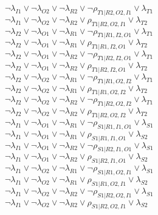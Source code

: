$\neg\lambda_{I1} \vee \neg\lambda_{O2} \vee \neg\lambda_{R2} \vee \neg\rho_{T1|R2,O2,I1} \vee \lambda_{T1}$\\
$\neg\lambda_{I1} \vee \neg\lambda_{O2} \vee \neg\lambda_{R2} \vee \rho_{T1|R2,O2,I1} \vee \lambda_{T2}$\\
$\neg\lambda_{I2} \vee \neg\lambda_{O1} \vee \neg\lambda_{R1} \vee \neg\rho_{T1|R1,I2,O1} \vee \lambda_{T1}$\\
$\neg\lambda_{I2} \vee \neg\lambda_{O1} \vee \neg\lambda_{R1} \vee \rho_{T1|R1,I2,O1} \vee \lambda_{T2}$\\
$\neg\lambda_{I2} \vee \neg\lambda_{O1} \vee \neg\lambda_{R2} \vee \neg\rho_{T1|R2,I2,O1} \vee \lambda_{T1}$\\
$\neg\lambda_{I2} \vee \neg\lambda_{O1} \vee \neg\lambda_{R2} \vee \rho_{T1|R2,I2,O1} \vee \lambda_{T2}$\\
$\neg\lambda_{I2} \vee \neg\lambda_{O2} \vee \neg\lambda_{R1} \vee \neg\rho_{T1|R1,O2,I2} \vee \lambda_{T1}$\\
$\neg\lambda_{I2} \vee \neg\lambda_{O2} \vee \neg\lambda_{R1} \vee \rho_{T1|R1,O2,I2} \vee \lambda_{T2}$\\
$\neg\lambda_{I2} \vee \neg\lambda_{O2} \vee \neg\lambda_{R2} \vee \neg\rho_{T1|R2,O2,I2} \vee \lambda_{T1}$\\
$\neg\lambda_{I2} \vee \neg\lambda_{O2} \vee \neg\lambda_{R2} \vee \rho_{T1|R2,O2,I2} \vee \lambda_{T2}$\\
$\neg\lambda_{I1} \vee \neg\lambda_{O1} \vee \neg\lambda_{R1} \vee \neg\rho_{S1|R1,I1,O1} \vee \lambda_{S1}$\\
$\neg\lambda_{I1} \vee \neg\lambda_{O1} \vee \neg\lambda_{R1} \vee \rho_{S1|R1,I1,O1} \vee \lambda_{S2}$\\
$\neg\lambda_{I1} \vee \neg\lambda_{O1} \vee \neg\lambda_{R2} \vee \neg\rho_{S1|R2,I1,O1} \vee \lambda_{S1}$\\
$\neg\lambda_{I1} \vee \neg\lambda_{O1} \vee \neg\lambda_{R2} \vee \rho_{S1|R2,I1,O1} \vee \lambda_{S2}$\\
$\neg\lambda_{I1} \vee \neg\lambda_{O2} \vee \neg\lambda_{R1} \vee \neg\rho_{S1|R1,O2,I1} \vee \lambda_{S1}$\\
$\neg\lambda_{I1} \vee \neg\lambda_{O2} \vee \neg\lambda_{R1} \vee \rho_{S1|R1,O2,I1} \vee \lambda_{S2}$\\
$\neg\lambda_{I1} \vee \neg\lambda_{O2} \vee \neg\lambda_{R2} \vee \neg\rho_{S1|R2,O2,I1} \vee \lambda_{S1}$\\
$\neg\lambda_{I1} \vee \neg\lambda_{O2} \vee \neg\lambda_{R2} \vee \rho_{S1|R2,O2,I1} \vee \lambda_{S2}$\\
